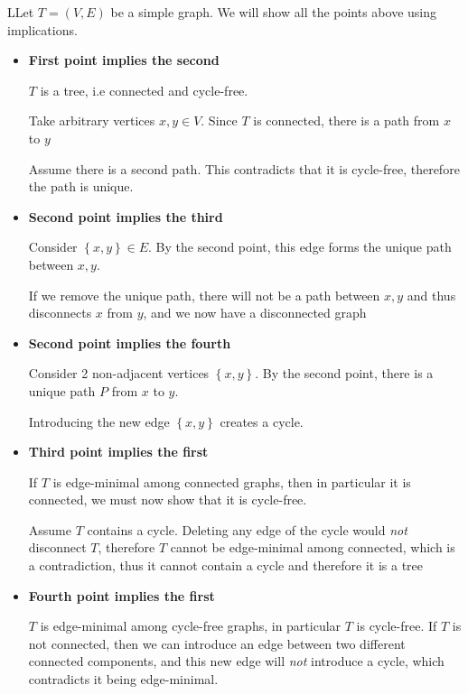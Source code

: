 \begin{prf}
  LLet $T = (V,E)$ be a simple graph. We will show all the points above using implications. 
  \par\bigskip
  \begin{itemize}
    \item\textbf{First point implies the second}\par
      $T$ is a tree, i.e connected and cycle-free.\par
      Take arbitrary vertices $x,y\in V$. Since $T$ is connected, there is a path from $x$ to $y$\par
      Assume there is a second path. This contradicts that it is cycle-free, therefore the path is unique.
      \par\bigskip
    \item\textbf{Second point implies the third}\par
    Consider $\left\{x,y\right\}\in E$. By the second point, this edge forms the unique path between $x,y$.\par
    If we remove the unique path, there will not be a path between $x,y$ and thus disconnects $x$ from $y$, and we now have a disconnected graph
    \par\bigskip
  \item\textbf{Second point implies the fourth}\par
    Consider 2 non-adjacent vertices $\left\{x,y\right\}$. By the second point, there is a unique path $P$ from $x$ to $y$.\par
    Introducing the new edge $\left\{x,y\right\}$ creates a cycle.
  \par\bigskip
  \item\textbf{Third point implies the first}\par
    If $T$ is edge-minimal among connected graphs, then in particular it is connected, we must now show that it is cycle-free.\par
    Assume $T$ contains a cycle. Deleting any edge of the cycle would \textit{not} disconnect $T$, therefore $T$ cannot be edge-minimal among connected, which is a contradiction, thus it cannot contain a cycle and therefore it is a tree
  \item\textbf{Fourth point implies the first}\par
    $T$ is edge-minimal among cycle-free graphs, in particular $T$ is cycle-free. If $T$ is not connected, then we can introduce an edge between two different connected components, and this new edge will \textit{not} introduce a cycle, which contradicts it being edge-minimal. 
  \end{itemize}
\end{prf}
